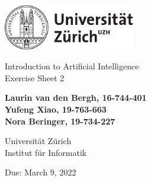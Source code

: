 \documentclass[12pt]{article}
\begin{document}
\begin{titlepage}
\includegraphics[height=20mm]{../images/uzh_logo}\\

\begin{flushleft}

\vspace{2cm}

{\Large Introduction to Artificial Intelligence\\Exercise Sheet 2}\\

\vspace{4cm}

\textbf{Laurin van den Bergh, 16-744-401\\Yufeng Xiao, 19-763-663\\Nora Beringer, 19-734-227}\\

\vspace{2cm}

Universität Zürich\\
Institut für Informatik

\vfill Due: March 9, 2022

\vspace{3cm}


\end{flushleft}
\end{titlepage}

\newpage
\end{document}

